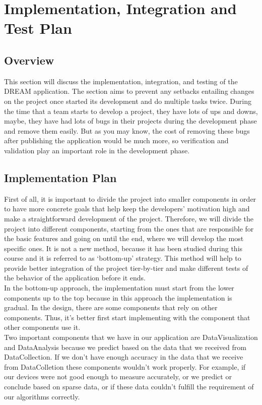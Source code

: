 \section{Implementation, Integration and Test Plan}
\subsection{Overview}
\vspace{0.5cm}
This section will discuss the implementation, integration, and testing of the DREAM application. The section aims to prevent any setbacks entailing changes on the project once started its development and do multiple tasks twice. During the time that a team starts to develop a project, they have lots of ups and downs, maybe, they have had lots of bugs in their projects during the development phase and remove them easily. But as you may know, the cost of removing these bugs after publishing the application would be much more, so verification and validation play an important role in the development phase.

\subsection{Implementation Plan}
\vspace{0.5cm}

First of all, it is important to divide the project into smaller components in order to have more concrete goals that help keep the developers’ motivation high and make a straightforward development of the project. Therefore, we will divide the project into different components, starting from the ones that are responsible for the basic features and going on until the end, where we will develop the most specific ones. It is not a new method, because it has been studied during this course and it is referred to as ‘bottom-up’ strategy. This method will help to provide better integration of the project tier-by-tier and make different tests of the behavior of the application before it ends.\\
In the bottom-up approach, the implementation must start from the lower components up to the top because in this approach the implementation is gradual. In the design, there are some components that rely on other components. Thus, it's better first start implementing with the component that other components use it.\\

Two important components that we have in our application are DataVisualization and DataAnalysis because we predict based on the data that we received from DataCollection. If we don't have enough accuracy in the data that we receive from DataColletion these components wouldn't work properly. For example, if our devices were not good enough to measure accurately, or we predict or conclude based on sparse data, or if these data couldn't fulfill the requirement of our algorithms correctly.


